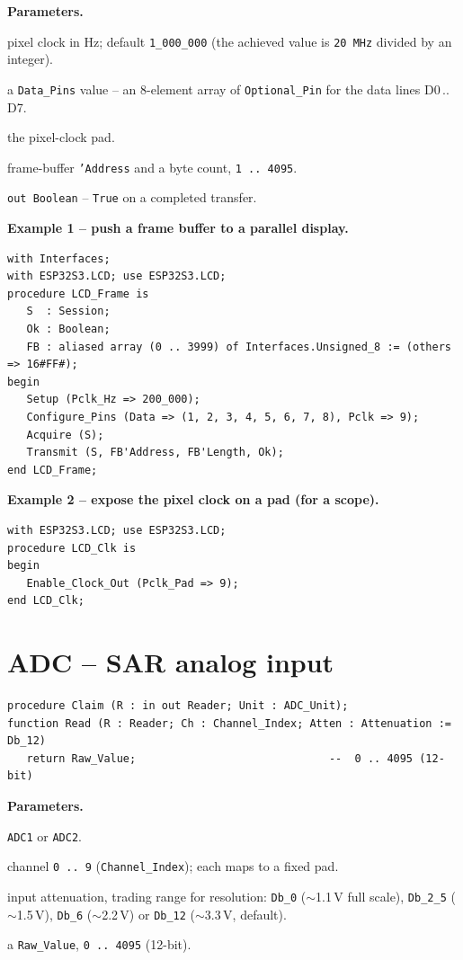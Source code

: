 \textbf{Parameters.}
\begin{description}[style=nextline]
\item[\texttt{Pclk\_Hz}] pixel clock in Hz; default \texttt{1\_000\_000} (the
  achieved value is \texttt{20\,MHz} divided by an integer).
\item[\texttt{Data}] a \texttt{Data\_Pins} value -- an 8-element array of
  \texttt{Optional\_Pin} for the data lines D0\,..\,D7.
\item[\texttt{Pclk} / \texttt{Pclk\_Pad}] the pixel-clock pad.
\item[\texttt{Tx}, \texttt{Length}] frame-buffer \texttt{'Address} and a byte
  count, \texttt{1\,..\,4095}.
\item[\texttt{Ok}] \texttt{out Boolean} -- \texttt{True} on a completed transfer.
\end{description}

\textbf{Example 1 -- push a frame buffer to a parallel display.}
\begin{lstlisting}
with Interfaces;
with ESP32S3.LCD; use ESP32S3.LCD;
procedure LCD_Frame is
   S  : Session;
   Ok : Boolean;
   FB : aliased array (0 .. 3999) of Interfaces.Unsigned_8 := (others => 16#FF#);
begin
   Setup (Pclk_Hz => 200_000);
   Configure_Pins (Data => (1, 2, 3, 4, 5, 6, 7, 8), Pclk => 9);
   Acquire (S);
   Transmit (S, FB'Address, FB'Length, Ok);
end LCD_Frame;
\end{lstlisting}

\textbf{Example 2 -- expose the pixel clock on a pad (for a scope).}
\begin{lstlisting}
with ESP32S3.LCD; use ESP32S3.LCD;
procedure LCD_Clk is
begin
   Enable_Clock_Out (Pclk_Pad => 9);
end LCD_Clk;
\end{lstlisting}

\section{ADC -- SAR analog input}

\begin{lstlisting}
procedure Claim (R : in out Reader; Unit : ADC_Unit);
function Read (R : Reader; Ch : Channel_Index; Atten : Attenuation := Db_12)
   return Raw_Value;                              --  0 .. 4095 (12-bit)
\end{lstlisting}

\textbf{Parameters.}
\begin{description}[style=nextline]
\item[\texttt{Unit}] \texttt{ADC1} or \texttt{ADC2}.
\item[\texttt{Ch}] channel \texttt{0\,..\,9} (\texttt{Channel\_Index}); each maps to
  a fixed pad.
\item[\texttt{Atten}] input attenuation, trading range for resolution:
  \texttt{Db\_0} ($\sim$1.1\,V full scale), \texttt{Db\_2\_5} ($\sim$1.5\,V),
  \texttt{Db\_6} ($\sim$2.2\,V) or \texttt{Db\_12} ($\sim$3.3\,V, default).
\item[returns] a \texttt{Raw\_Value}, \texttt{0\,..\,4095} (12-bit).
\end{description}


